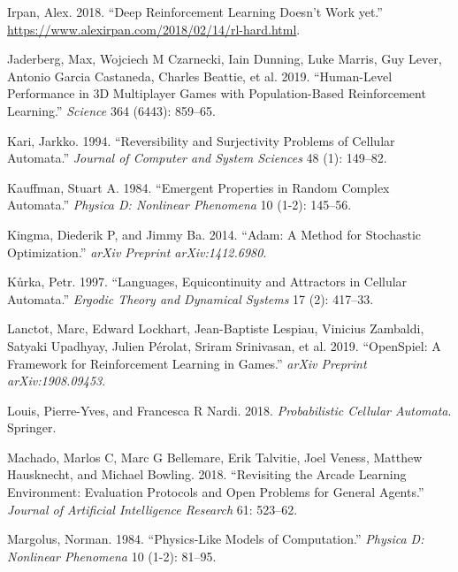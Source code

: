\documentclass[
  12pt,
  openany]{book}
\newlength{\cslhangindent}
\newenvironment{cslreferences}%
  {\setlength{\parindent}{0pt}%
  \everypar{\setlength{\hangindent}{\cslhangindent}}\ignorespaces}%
  {\par}
\begin{document}
\begin{cslreferences}
\leavevmode\hypertarget{ref-rlblogpost}{}%
Irpan, Alex. 2018. ``Deep Reinforcement Learning Doesn't Work yet.'' \url{https://www.alexirpan.com/2018/02/14/rl-hard.html}.

\leavevmode\hypertarget{ref-jaderberg2019human}{}%
Jaderberg, Max, Wojciech M Czarnecki, Iain Dunning, Luke Marris, Guy Lever, Antonio Garcia Castaneda, Charles Beattie, et al. 2019. ``Human-Level Performance in 3D Multiplayer Games with Population-Based Reinforcement Learning.'' \emph{Science} 364 (6443): 859--65.

\leavevmode\hypertarget{ref-kari1994reversibility}{}%
Kari, Jarkko. 1994. ``Reversibility and Surjectivity Problems of Cellular Automata.'' \emph{Journal of Computer and System Sciences} 48 (1): 149--82.

\leavevmode\hypertarget{ref-kauffman1984emergent}{}%
Kauffman, Stuart A. 1984. ``Emergent Properties in Random Complex Automata.'' \emph{Physica D: Nonlinear Phenomena} 10 (1-2): 145--56.

\leavevmode\hypertarget{ref-kingma2014adam}{}%
Kingma, Diederik P, and Jimmy Ba. 2014. ``Adam: A Method for Stochastic Optimization.'' \emph{arXiv Preprint arXiv:1412.6980}.

\leavevmode\hypertarget{ref-kuurka1997languages}{}%
Kůrka, Petr. 1997. ``Languages, Equicontinuity and Attractors in Cellular Automata.'' \emph{Ergodic Theory and Dynamical Systems} 17 (2): 417--33.

\leavevmode\hypertarget{ref-lanctot2019openspiel}{}%
Lanctot, Marc, Edward Lockhart, Jean-Baptiste Lespiau, Vinicius Zambaldi, Satyaki Upadhyay, Julien Pérolat, Sriram Srinivasan, et al. 2019. ``OpenSpiel: A Framework for Reinforcement Learning in Games.'' \emph{arXiv Preprint arXiv:1908.09453}.

\leavevmode\hypertarget{ref-louis2018probabilistic}{}%
Louis, Pierre-Yves, and Francesca R Nardi. 2018. \emph{Probabilistic Cellular Automata}. Springer.

\leavevmode\hypertarget{ref-machado2018revisiting}{}%
Machado, Marlos C, Marc G Bellemare, Erik Talvitie, Joel Veness, Matthew Hausknecht, and Michael Bowling. 2018. ``Revisiting the Arcade Learning Environment: Evaluation Protocols and Open Problems for General Agents.'' \emph{Journal of Artificial Intelligence Research} 61: 523--62.

\leavevmode\hypertarget{ref-margolus1984physics}{}%
Margolus, Norman. 1984. ``Physics-Like Models of Computation.'' \emph{Physica D: Nonlinear Phenomena} 10 (1-2): 81--95.


\end{cslreferences}
\end{document}
